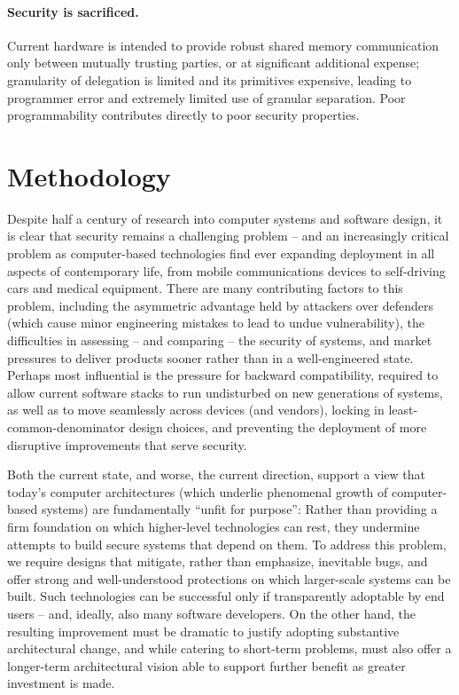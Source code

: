 \paragraph{Security is sacrificed.}
Current hardware is intended to provide robust
shared memory communication only between mutually trusting parties, or at
significant additional expense; granularity of delegation is limited and its
primitives expensive, leading to programmer error and extremely limited use
of granular separation.
Poor programmability contributes directly to poor security properties.

\section{Methodology}

Despite half a century of research into computer systems and software design,
it is clear that security remains a challenging problem -- and an increasingly
critical problem as computer-based technologies find ever expanding deployment
in all aspects of contemporary life, from mobile communications devices to
self-driving cars and medical equipment.
There are many contributing factors to this problem, including the asymmetric
advantage held by attackers over defenders (which cause minor engineering
mistakes to lead to undue vulnerability), the difficulties in assessing -- and
comparing -- the security of systems, and market pressures to deliver products
sooner rather than in a well-engineered state.
Perhaps most influential is the pressure for backward compatibility, required
to allow current software stacks to run undisturbed on new generations of
systems, as well as to move seamlessly across devices (and vendors), locking
in least-common-denominator design choices, and preventing the deployment of
more disruptive improvements that serve security.

Both the current state, and worse, the current direction, support a view that
today's computer architectures (which underlie phenomenal growth of
computer-based systems) are fundamentally ``unfit for purpose'': Rather than
providing a firm foundation on which higher-level technologies can rest, they
undermine attempts to build secure systems that depend on them.
To address this problem, we require designs that mitigate, rather than
emphasize, inevitable bugs, and offer strong and well-understood protections
on which larger-scale systems can be built.
Such technologies can be successful only if transparently adoptable by end
users -- and, ideally, also many software developers.
On the other hand, the resulting improvement must be dramatic to justify
adopting substantive architectural change, and while catering to short-term
problems, must also offer a longer-term architectural vision able to support
further benefit as greater investment is made.

